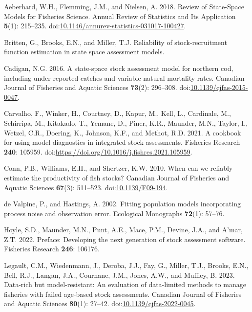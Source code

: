 \documentclass[
  12pt,
]{article}
\newlength{\cslhangindent}
\newlength{\cslentryspacingunit} %
\newenvironment{CSLReferences}[2] %
 {%
  \setlength{\parindent}{0pt}
  \ifodd #1
  \let\oldpar\par
  \def\par{\hangindent=\cslhangindent\oldpar}
  \fi
  \setlength{\parskip}{#2\cslentryspacingunit}
 }%
 {}
\begin{document}
\hypertarget{refs}{}
\begin{CSLReferences}{1}{0}
\leavevmode{}%
Aeberhard, W.H., Flemming, J.M., and Nielsen, A. 2018. Review of
{State}-{Space Models} for {Fisheries Science}. Annual Review of
Statistics and Its Application \textbf{5}(1): 215--235.
doi:\href{https://doi.org/10.1146/annurev-statistics-031017-100427}{10.1146/annurev-statistics-031017-100427}.

\leavevmode{}%
Britten, G., Brooks, E.N., and Miller, T.J. Reliability of
stock-recruitment function estimation in state space assessment models.

\leavevmode{}%
Cadigan, N.G. 2016. A state-space stock assessment model for northern
cod, including under-reported catches and variable natural mortality
rates. Canadian Journal of Fisheries and Aquatic Sciences
\textbf{73}(2): 296--308.
doi:\href{https://doi.org/10.1139/cjfas-2015-0047}{10.1139/cjfas-2015-0047}.

\leavevmode{}%
Carvalho, F., Winker, H., Courtney, D., Kapur, M., Kell, L., Cardinale,
M., Schirripa, M., Kitakado, T., Yemane, D., Piner, K.R., Maunder, M.N.,
Taylor, I., Wetzel, C.R., Doering, K., Johnson, K.F., and Methot, R.D.
2021. A cookbook for using model diagnostics in integrated stock
assessments. Fisheries Research \textbf{240}: 105959.
doi:\url{https://doi.org/10.1016/j.fishres.2021.105959}.

\leavevmode{}%
Conn, P.B., Williams, E.H., and Shertzer, K.W. 2010. When can we
reliably estimate the productivity of fish stocks? Canadian Journal of
Fisheries and Aquatic Sciences \textbf{67}(3): 511--523.
doi:\href{https://doi.org/10.1139/F09-194}{10.1139/F09-194}.

\leavevmode{}%
de Valpine, P., and Hastings, A. 2002. Fitting population models
incorporating process noise and observation error. Ecological Monographs
\textbf{72}(1): 57--76.

\leavevmode{}%
Hoyle, S.D., Maunder, M.N., Punt, A.E., Mace, P.M., Devine, J.A., and
A'mar, Z.T. 2022. Preface: Developing the next generation of stock
assessment software. Fisheries Research \textbf{246}: 106176.

\leavevmode{}%
Legault, C.M., Wiedenmann, J., Deroba, J.J., Fay, G., Miller, T.J.,
Brooks, E.N., Bell, R.J., Langan, J.A., Cournane, J.M., Jones, A.W., and
Muffley, B. 2023. Data-rich but model-resistant: An evaluation of
data-limited methods to manage fisheries with failed age-based stock
assessments. Canadian Journal of Fisheries and Aquatic Sciences
\textbf{80}(1): 27--42.
doi:\href{https://doi.org/10.1139/cjfas-2022-0045}{10.1139/cjfas-2022-0045}.


\end{CSLReferences}
\end{document}
